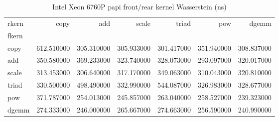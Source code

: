 \begin{table}
\caption{Intel Xeon 6760P papi front/rear kernel Wasserstein (ns)}
\begin{tabular}{lrrrrrr}
\toprule
rkern & copy & add & scale & triad & pow & dgemm \\
fkern &  &  &  &  &  &  \\
\midrule
copy & 612.510000 & 305.310000 & 305.933000 & 301.417000 & 351.940000 & 308.837000 \\
add & 350.580000 & 369.233000 & 323.740000 & 328.073000 & 293.097000 & 320.017000 \\
scale & 313.453000 & 306.640000 & 317.170000 & 349.063000 & 310.043000 & 320.810000 \\
triad & 330.500000 & 498.490000 & 332.990000 & 544.087000 & 326.983000 & 328.677000 \\
pow & 371.787000 & 254.013000 & 245.857000 & 263.040000 & 258.527000 & 239.323000 \\
dgemm & 274.333000 & 246.000000 & 265.667000 & 274.663000 & 256.590000 & 240.990000 \\
\bottomrule
\end{tabular}
\end{table}
